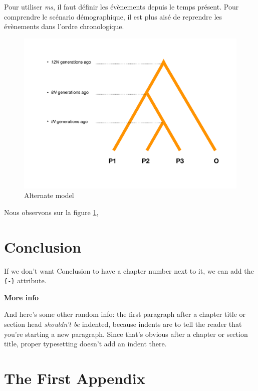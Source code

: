 \documentclass[12pt,twoside]{reedthesis}
\begin{document}
  Pour utiliser \emph{ms}, il faut définir les évènements depuis le temps
  présent. Pour comprendre le scénario démographique, il est plus aisé de
  reprendre les évènements dans l'ordre chronologique.
  
  \begin{figure}
  \includegraphics[scale=0.5]{figure/alternate} \caption{Alternate model}\label{fig:alternate}
  \end{figure}
  
  Nous observons sur la figure \ref{fig:alternate},
  
  \chapter*{Conclusion}\label{conclusion}
  
  If we don't want Conclusion to have a chapter number next to it, we can
  add the \texttt{\{-\}} attribute.
  
  \textbf{More info}
  
  And here's some other random info: the first paragraph after a chapter
  title or section head \emph{shouldn't be} indented, because indents are
  to tell the reader that you're starting a new paragraph. Since that's
  obvious after a chapter or section title, proper typesetting doesn't add
  an indent there.
  
  \appendix
  
  \chapter{The First Appendix}\label{the-first-appendix}
  
\end{document}
